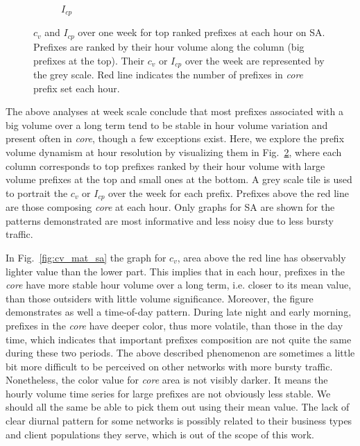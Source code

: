 \begin{figure}
\begin{subfigure}[b]{0.85\textwidth}
                \caption{$I_{cp}$}
                \label{fig:cp_mat_sa}
        \end{subfigure}
\caption{$c_v$ and $I_{cp}$ over one week for top ranked prefixes at each hour on SA. Prefixes are ranked by their hour volume along the column (big prefixes at the top). Their $c_v$ or $I_{cp}$ over the week are represented by the grey scale. Red line indicates the number of prefixes in \textit{core} prefix set each hour.}
\label{fig:cv_cp_mat}
\end{figure}

The above analyses at week scale conclude that most prefixes associated with a big volume over a long term tend to be stable in hour volume variation and present often in \textit{core}, though a few exceptions exist.
Here, we explore the prefix volume dynamism at hour resolution by visualizing them in Fig.~\ref{fig:cv_cp_mat}, where each column corresponds to top prefixes ranked by their hour volume with large volume prefixes at the top and small ones at the bottom. A grey scale tile is used to portrait the $c_v$ or $I_{cp}$ over the week for each prefix. Prefixes above the red line are those composing \textit{core} at each hour.
Only graphs for SA are shown for the patterns demonstrated are most informative and less noisy due to less bursty traffic.

In Fig.~\ref{fig:cv_mat_sa} the graph for $c_v$, area above the red line has observably lighter value than the lower part. 
This implies that in each hour, prefixes in the \textit{core} have more stable hour volume over a long term, i.e. closer to its mean value,  than those outsiders with little volume significance.
Moreover, the figure demonstrates as well a time-of-day pattern. 
During late night and early morning, prefixes in the \textit{core} have deeper color, thus more volatile, than those in the day time, which indicates that important prefixes composition are not quite the same during these two periods.
The above described phenomenon are sometimes a little bit more difficult to be perceived on other networks with more bursty traffic. 
Nonetheless, the color value for \textit{core} area is not visibly darker.
It means the hourly volume time series for large prefixes are not obviously less stable.
We should all the same be able to pick them out using their mean value.
The lack of clear diurnal pattern for some networks is possibly related to their business types and client populations they serve, which is out of the scope of this work.

